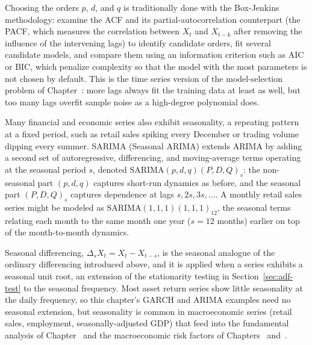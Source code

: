 \documentclass[../ai_in_finance]{subfiles}
\begin{document}
Choosing the orders $p$, $d$, and $q$ is traditionally done with the Box-Jenkins methodology: examine the ACF and its partial-autocorrelation
counterpart (the PACF, which measures the correlation between $X_t$ and $X_{t-k}$ after removing the influence of the
intervening lags) to identify candidate orders, fit several candidate models, and compare them using an information criterion such as AIC or BIC, which penalize
complexity so that the model with the most parameters is not chosen by default. This is the time series version of the model-selection problem of Chapter~:
more lags always fit the training data at least as well, but too many lags overfit sample noise as a high-degree polynomial does.

Many financial and economic series also exhibit seasonality, a repeating pattern at a fixed period, such as retail sales spiking every December or trading
volume dipping every summer. SARIMA (Seasonal ARIMA) extends ARIMA by adding a second set of autoregressive, differencing, and
moving-average terms operating at the seasonal period $s$, denoted $\text{SARIMA}(p,d,q)(P,D,Q)_s$: the non-seasonal part $(p,d,q)$ captures short-run
dynamics as before, and the seasonal part $(P,D,Q)_s$ captures dependence at lags $s, 2s, 3s, \ldots$. A monthly retail sales
series might be modeled as $\text{SARIMA}(1,1,1)(1,1,1)_{12}$, the seasonal terms relating each month to
the same month one year ($s=12$ months) earlier on top of the month-to-month dynamics.

Seasonal differencing, $\Delta_s X_t = X_t - X_{t-s}$, is the seasonal analogue of the ordinary differencing introduced above, and it is applied when a series
exhibits a seasonal unit root, an extension of the stationarity testing in Section~\ref{sec:adf-test} to the seasonal frequency. Most asset return series show little seasonality at the daily frequency, so this chapter's GARCH and ARIMA examples need no seasonal extension,
but seasonality is common in macroeconomic series (retail sales, employment, seasonally-adjusted GDP) that feed into the fundamental analysis of
 Chapter~ and the macroeconomic risk factors of Chapters~ and~.

\label{sec:treasury-diagnostics}
\end{document}
